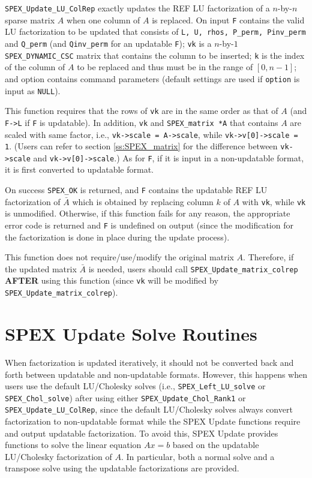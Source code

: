 \documentclass[12pt,oneside]{book}
\theoremstyle{definition}
\begin{document}
{\verb|SPEX_Update_LU_ColRep| exactly updates the REF LU factorization of a  $n$-by-$n$ sparse matrix $A$ when one column of $A$ is replaced. On input \verb|F| contains the valid LU factorization to be updated that consists of \verb|L, U, rhos, P_perm, Pinv_perm| and \verb|Q_perm| (and \verb|Qinv_perm| for an updatable \verb|F|); \verb|vk| is a $n$-by-$1$ \verb|SPEX_DYNAMIC_CSC| matrix that contains the column to be inserted; \verb|k| is the index of the column of $A$ to be replaced and thus must be in the range of $[0,n-1]$; and option contains command parameters (default settings are used if \verb|option| is input as \verb|NULL|).


This function requires that the rows of \verb|vk| are in the same order as that of $A$ (and \verb|F->L| if \verb|F| is updatable). In addition, \verb|vk| and \verb|SPEX_matrix *A| that contains $A$ are scaled with same factor, i.e., \verb|vk->scale = A->scale|, while \verb|vk->v[0]->scale = 1|. (Users can refer to section \ref{ss:SPEX_matrix} for the difference between \verb|vk->scale| and \verb|vk->v[0]->scale|.) As for \verb|F|, if it is input in a non-updatable format, it is first converted to updatable format.

On success \verb|SPEX_OK| is returned, and  \verb|F| contains the updatable REF LU factorization of $\bar{A}$ which is obtained by replacing column $k$ of $A$ with \verb|vk|, while \verb|vk| is unmodified.
Otherwise, if this function fails for any reason, the appropriate error code is returned and \verb|F| is undefined on output (since the modification for the factorization is done in place during the update process).

This function does not require/use/modify the original matrix $A$. Therefore, if the updated matrix $\bar{A}$ is needed, users should call \verb|SPEX_Update_matrix_colrep| {\bf AFTER} using this function (since \verb|vk| will be modified by \verb|SPEX_Update_matrix_colrep|). 


\section{SPEX Update Solve Routines}
When factorization is updated iteratively, it should not be converted back and forth between updatable and non-updatable formats. However, this happens when users use the default LU/Cholesky solves (i.e., \verb|SPEX_Left_LU_solve| or \verb|SPEX_Chol_solve|) after using either \verb|SPEX_Update_Chol_Rank1| or \verb|SPEX_Update_LU_ColRep|, since the default LU/Cholesky solves always convert factorization to non-updatable format while the SPEX Update functions require and output updatable factorization.  To avoid this, SPEX Update provides functions to solve the linear equation $Ax=b$ based on the updatable LU/Cholesky factorization of $A$. In particular, both a normal solve and a transpose solve using the updatable factorizations are provided.


}
\end{document}
